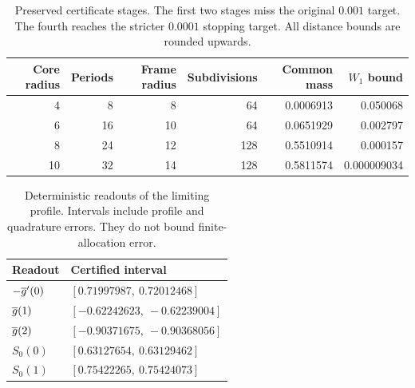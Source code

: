 \begin{table}[htbp]
\caption{Preserved certificate stages. The first two stages miss the original
$0.001$ target. The fourth reaches the stricter $0.0001$ stopping target.
All distance bounds are rounded upwards.}
\label{tab:certificate}
\centering\small
\begin{tabular}{rrrrrr}\toprule
Core radius & Periods & Frame radius & Subdivisions & Common mass & $W_1$ bound\\\midrule
4 & 8 & 8 & 64 & 0.0006913 & 0.050068\\
6 & 16 & 10 & 64 & 0.0651929 & 0.002797\\
8 & 24 & 12 & 128 & 0.5510914 & 0.000157\\
10 & 32 & 14 & 128 & 0.5811574 & 0.000009034\\\bottomrule
\end{tabular}
\end{table}
\begin{table}[htbp]
\caption{Deterministic readouts of the limiting profile. Intervals include
profile and quadrature errors. They do not bound finite-allocation error.}
\label{tab:readouts}
\centering
\begin{tabular}{ll}\toprule
Readout & Certified interval\\\midrule
$-\overline g'(0)$ & $[0.71997987,\ 0.72012468]$\\
$\overline g(1)$ & $[-0.62242623,\ -0.62239004]$\\
$\overline g(2)$ & $[-0.90371675,\ -0.90368056]$\\
$S_0(0)$ & $[0.63127654,\ 0.63129462]$\\
$S_0(1)$ & $[0.75422265,\ 0.75424073]$\\\bottomrule
\end{tabular}
\end{table}
